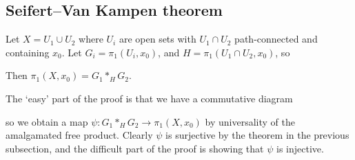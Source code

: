 \subsection{Seifert--Van Kampen theorem}
\begin{theorem}
	Let \( X = U_1 \cup U_2 \) where \( U_i \) are open sets with \( U_1 \cap U_2 \) path-connected and containing \( x_0 \).
	Let \( G_i = \pi_1(U_i, x_0) \), and \( H = \pi_1(U_1 \cap U_2, x_0) \), so
	\begin{center}
	\end{center}
	Then \( \pi_1(X, x_0) = G_1 \ast_H G_2 \).
\end{theorem}
\begin{remark}
	The `easy' part of the proof is that we have a commutative diagram
	\begin{center}
	\end{center}
	so we obtain a map \( \psi \colon G_1 \ast_H G_2 \to \pi_1(X,x_0) \) by universality of the amalgamated free product.
	Clearly \( \psi \) is surjective by the theorem in the previous subsection, and the difficult part of the proof is showing that \( \psi \) is injective.
\end{remark}
